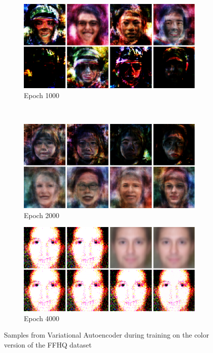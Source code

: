 \begin{figure}[h!]
    \begin{subfigure}[b]{0.45\textwidth}
         \includegraphics[width=\textwidth]{fig/vae/ffhq_epoch1000color}
        \caption{Epoch 1000}
    \end{subfigure}
    ~
    \begin{subfigure}[b]{0.45\textwidth}
         \includegraphics[width=\textwidth]{fig/vae/ffhq_epoch2000color}
        \caption{Epoch 2000}
    \end{subfigure}

    \begin{subfigure}[b]{\textwidth}
         \includegraphics[width=\textwidth]{fig/vae/ffhq_epoch4000color}
        \caption{Epoch 4000}
    \end{subfigure}
    \caption{Samples from Variational Autoencoder during training on the color version of the FFHQ dataset}
    \label{vaq-ffhq-samples}
\end{figure}



